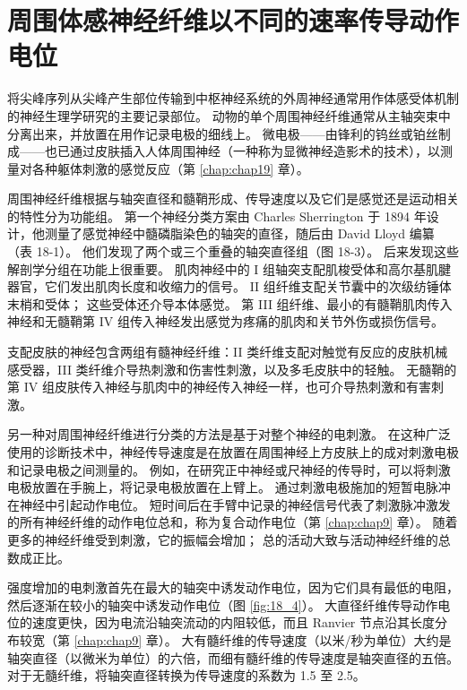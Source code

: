 


\section{周围体感神经纤维以不同的速率传导动作电位}

将尖峰序列从尖峰产生部位传输到中枢神经系统的外周神经通常用作体感受体机制的神经生理学研究的主要记录部位。 
动物的单个周围神经纤维通常从主轴突束中分离出来，并放置在用作记录电极的细线上。 
微电极——由锋利的钨丝或铂丝制成——也已通过皮肤插入人体周围神经（一种称为显微神经造影术的技术），以测量对各种躯体刺激的感觉反应（第 \ref{chap:chap19} 章）。


周围神经纤维根据与轴突直径和髓鞘形成、传导速度以及它们是感觉还是运动相关的特性分为功能组。 
第一个神经分类方案由 Charles Sherrington 于 1894 年设计，他测量了感觉神经中髓磷脂染色的轴突的直径，随后由 David Lloyd 编纂（表 18-1）。 
他们发现了两个或三个重叠的轴突直径组（图 18-3）。 
后来发现这些解剖学分组在功能上很重要。 
肌肉神经中的 I 组轴突支配肌梭受体和高尔基肌腱器官，它们发出肌肉长度和收缩力的信号。 
II 组纤维支配关节囊中的次级纺锤体末梢和受体； 这些受体还介导本体感觉。 
第 III 组纤维、最小的有髓鞘肌肉传入神经和无髓鞘第 IV 组传入神经发出感觉为疼痛的肌肉和关节外伤或损伤信号。


支配皮肤的神经包含两组有髓神经纤维：II 类纤维支配对触觉有反应的皮肤机械感受器，III 类纤维介导热刺激和伤害性刺激，以及多毛皮肤中的轻触。 
无髓鞘的第 IV 组皮肤传入神经与肌肉中的神经传入神经一样，也可介导热刺激和有害刺激。


另一种对周围神经纤维进行分类的方法是基于对整个神经的电刺激。 
在这种广泛使用的诊断技术中，神经传导速度是在放置在周围神经上方皮肤上的成对刺激电极和记录电极之间测量的。 
例如，在研究正中神经或尺神经的传导时，可以将刺激电极放置在手腕上，将记录电极放置在上臂上。 
通过刺激电极施加的短暂电脉冲在神经中引起动作电位。 
短时间后在手臂中记录的神经信号代表了刺激脉冲激发的所有神经纤维的动作电位总和，称为复合动作电位（第 \ref{chap:chap9} 章）。 
随着更多的神经纤维受到刺激，它的振幅会增加； 总的活动大致与活动神经纤维的总数成正比。


强度增加的电刺激首先在最大的轴突中诱发动作电位，因为它们具有最低的电阻，然后逐渐在较小的轴突中诱发动作电位（图 \ref{fig:18_4}）。 
大直径纤维传导动作电位的速度更快，因为电流沿轴突流动的内阻较低，而且 Ranvier 节点沿其长度分布较宽（第 \ref{chap:chap9} 章）。 
大有髓纤维的传导速度（以米/秒为单位）大约是轴突直径（以微米为单位）的六倍，而细有髓纤维的传导速度是轴突直径的五倍。 
对于无髓纤维，将轴突直径转换为传导速度的系数为 1.5 至 2.5。


